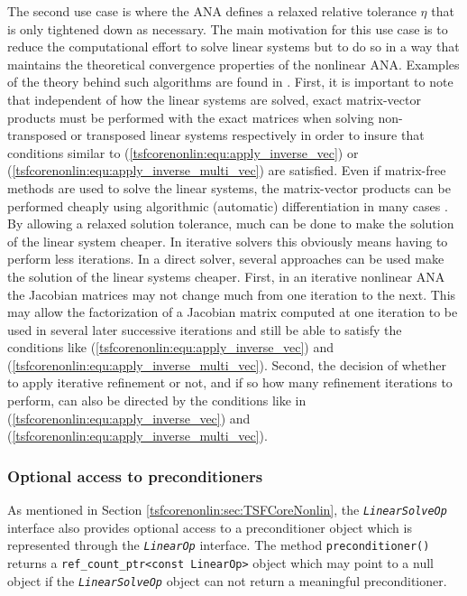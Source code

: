 The second use case is where the ANA defines a relaxed relative tolerance
$\eta$ that is only tightened down as necessary.  The main
motivation for this use case is to reduce the computational effort to
solve linear systems but to do so in a way that maintains the
theoretical convergence properties of the nonlinear ANA.  Examples of
the theory behind such algorithms are found in
\cite{JEDennis_MHeinkenschloss_LNVicente_1998}.  First, it is
important to note that independent of how the linear systems are
solved, exact matrix-vector products must be performed with the exact
matrices when solving non-transposed or transposed linear systems
respectively in order to insure that conditions similar to
(\ref{tsfcorenonlin:equ:apply_inverse_vec}) or
(\ref{tsfcorenonlin:equ:apply_inverse_multi_vec}) are satisfied.  Even
if matrix-free methods are used to solve the linear systems, the
matrix-vector products can be performed cheaply using algorithmic
(automatic) differentiation in many cases \cite{ref:adolc_1996}.  By
allowing a relaxed solution tolerance, much can be done to make the
solution of the linear system cheaper.  In iterative solvers this
obviously means having to perform less iterations.  In a direct
solver, several approaches can be used make the solution of the linear
systems cheaper.  First, in an iterative nonlinear ANA the Jacobian
matrices may not change much from one iteration to the next.  This may
allow the factorization of a Jacobian matrix computed at one iteration
to be used in several later successive iterations and still be able to
satisfy the conditions like
(\ref{tsfcorenonlin:equ:apply_inverse_vec}) and
(\ref{tsfcorenonlin:equ:apply_inverse_multi_vec}).  Second, the
decision of whether to apply iterative refinement or not, and if so
how many refinement iterations to perform, can also be directed by the
conditions like in (\ref{tsfcorenonlin:equ:apply_inverse_vec}) and
(\ref{tsfcorenonlin:equ:apply_inverse_multi_vec}).

%
\subsubsection{Optional access to preconditioners}
\label{tsfcorenonlin:sec:preconditioners}
%

As mentioned in Section \ref{tsfcorenonlin:sec:TSFCoreNonlin}, the
\texttt{\textit{Linear\-Solve\-Op}} interface also provides
optional access to a preconditioner object which is represented
through the \texttt{\textit{LinearOp}} interface.  The
method \texttt{pre\-conditioner()} returns a
\texttt{ref\_count\_ptr<const LinearOp>} object which may
point to a null object if the \texttt{\textit{Linear\-Solve\-Op}}
object can not return a meaningful preconditioner.


